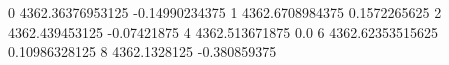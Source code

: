 0 4362.36376953125 -0.14990234375
1 4362.6708984375 0.1572265625
2 4362.439453125 -0.07421875
4 4362.513671875 0.0
6 4362.62353515625 0.10986328125
8 4362.1328125 -0.380859375
